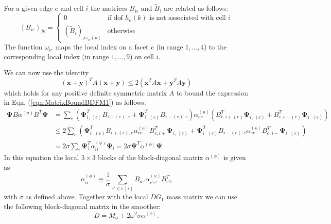 \documentclass[12pt]{article}
\renewcommand{\vec}[1]{\boldsymbol{#1}}
\begin{document}
For a given edge $e$ and cell $i$ the matrices $B_{ie}$ and $\tilde{B}_i$ are related as follows:
\begin{equation}
  \left(B_{ie}\right)_{jk} = \begin{cases}
  0 & \text{if dof $h_e(k)$ is not associated with cell $i$} \\
  \left(\tilde{B}_i\right)_{j\omega_{ie}(k)} & \text{otherwise}
\end{cases}
\end{equation}
The function $\omega_{ie}$ maps the local index on a facet $e$ (in range $1,\dots,4$) to the corresponding local index (in range $1,\dots,9$) on cell $i$.

We can now use the identity
\begin{equation}
\left(\vec{x}+\vec{y}\right)^T A \left(\vec{x}+\vec{y}\right)
\le 2\left(\vec{x}^T A\vec{x}+\vec{y}^T A\vec{y}\right)
\end{equation}
which holds for any positive definite symmetric matrix $A$ to bound the expression in Eqn. (\ref{eqn:MatrixBoundBDFM1}) as follows:
\begin{equation}
 \begin{aligned}
  \vec{\Psi} B \alpha^{(u)} B^T \vec{\Psi}
  &= \sum_{e} \left(\vec{\Psi}^T_{i_+(e)}B_{i+(e),e}+\vec{\Psi}^T_{i_-(e)}B_{i-(e),e}\right)\alpha^{(u)}_{ee}
\left(B^T_{e,i+(e)}\vec{\Psi}_{i_+(e)}+B^T_{e,i-(e)}\vec{\Psi}_{i_-(e)}\right)\\
  & \le 2\sum_e
\left(\vec{\Psi}^T_{i_+(e)}B_{i+(e),e}\alpha^{(u)}_{ee}B^T_{e,i+}\vec{\Psi}_{i_+(e)}
+\vec{\Psi}^T_{i_-(e)}B_{i-(e),e}\alpha^{(u)}_{ee}B^T_{e,i-}\vec{\Psi}_{i_-(e)}
\right)
\\
  &= 2 \sigma \sum_i \vec{\Psi}^T_i\alpha^{(\phi)}_{ii}\vec{\Psi}_i = 2\sigma \vec{\Psi}^T \alpha^{(\phi)}\vec{\Psi}
 \end{aligned}
\end{equation}
In this equation the local $3\times 3$ blocks of the block-diagonal matrix $\alpha^{(\phi)}$ is given as
\begin{equation}
  \alpha_{ii}^{(\phi)} \equiv \frac{1}{\sigma}\sum_{e'\in e(i)} B_{ie'}\alpha^{(u)}_{e'e'}B^T_{e'i}
\end{equation}
with $\sigma$ as defined above. 
Together with the local $DG_1$ mass matrix we can use the following block-diagonal matrix in the smoother:
\begin{equation}
  D = M_{\phi} + 2\omega^2 \sigma \alpha^{(\phi)}.
\end{equation}
\end{document}
